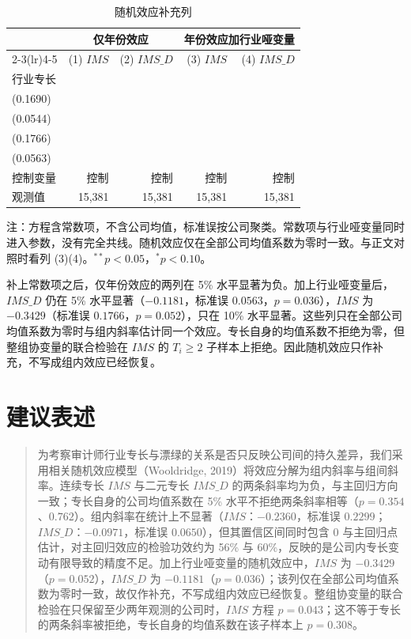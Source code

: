 \documentclass[12pt,a4paper]{article}
\begin{document}
\begin{table}[H]
\centering
\begin{threeparttable}
\caption{随机效应补充列}
\label{tab:re}
\renewcommand{\arraystretch}{1.25}
\begin{tabular}{lrrrr}
\toprule
 & \multicolumn{2}{c}{仅年份效应} & \multicolumn{2}{c}{年份效应加行业哑变量} \\
\cmidrule(lr){2-3}\cmidrule(lr){4-5}
 & (1) $IMS$ & (2) $IMS\_D$ & (3) $IMS$ & (4) $IMS\_D$ \\
\midrule
行业专长 & \shortstack{$-0.3653^{**}$\\(0.1690)} & \shortstack{$-0.1121^{**}$\\(0.0544)} & \shortstack{$-0.3429^{*}$\\(0.1766)} & \shortstack{$-0.1181^{**}$\\(0.0563)} \\
控制变量 & 控制 & 控制 & 控制 & 控制 \\
观测值 & 15,381 & 15,381 & 15,381 & 15,381 \\
\bottomrule
\end{tabular}
\begin{tablenotes}\footnotesize
\item 注：方程含常数项，不含公司均值，标准误按公司聚类。常数项与行业哑变量同时进入参数，没有完全共线。随机效应仅在全部公司均值系数为零时一致。与正文对照时看列 (3)(4)。$^{**}p<0.05$，$^{*}p<0.10$。
\end{tablenotes}
\end{threeparttable}
\end{table}

补上常数项之后，仅年份效应的两列在 5\% 水平显著为负。加上行业哑变量后，$IMS\_D$ 仍在 5\% 水平显著（$-0.1181$，标准误 $0.0563$，$p=0.036$），$IMS$ 为 $-0.3429$（标准误 $0.1766$，$p=0.052$），只在 10\% 水平显著。这些列只在全部公司均值系数为零时与组内斜率估计同一个效应。专长自身的均值系数不拒绝为零，但整组协变量的联合检验在 $IMS$ 的 $T_i\ge 2$ 子样本上拒绝。因此随机效应只作补充，不写成组内效应已经恢复。

\section{建议表述}

\begin{quote}
为考察审计师行业专长与漂绿的关系是否只反映公司间的持久差异，我们采用相关随机效应模型（Wooldridge, 2019）将效应分解为组内斜率与组间斜率。连续专长 $IMS$ 与二元专长 $IMS\_D$ 的两条斜率均为负，与主回归方向一致；专长自身的公司均值系数在 5\% 水平不拒绝两条斜率相等（$p=0.354$、$0.762$）。组内斜率在统计上不显著（$IMS$：$-0.2360$，标准误 $0.2299$；$IMS\_D$：$-0.0971$，标准误 $0.0650$），但其置信区间同时包含 0 与主回归点估计，对主回归效应的检验功效约为 56\% 与 60\%，反映的是公司内专长变动有限导致的精度不足。加上行业哑变量的随机效应中，$IMS$ 为 $-0.3429$（$p=0.052$），$IMS\_D$ 为 $-0.1181$（$p=0.036$）；该列仅在全部公司均值系数为零时一致，故仅作补充，不写成组内效应已经恢复。整组协变量的联合检验在只保留至少两年观测的公司时，$IMS$ 方程 $p=0.043$；这不等于专长的两条斜率被拒绝，专长自身的均值系数在该子样本上 $p=0.308$。
\end{quote}
\end{document}
